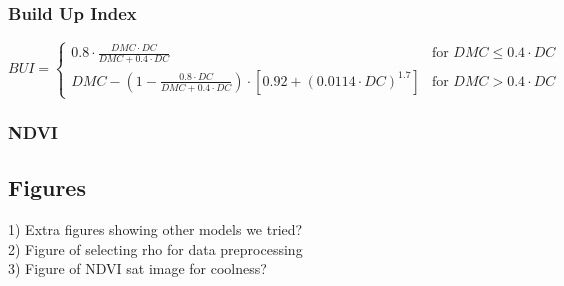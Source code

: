 \documentclass[twocolumn,10pt]{article}
\begin{document}
\subsubsection*{Build Up Index}
\begin{equation}
\label{eqn:bui}
    BUI = 
    \begin{cases}
        0.8 \cdot \frac{DMC \cdot DC}{DMC + 0.4 \cdot DC} & \text{for $DMC \leq 0.4 \cdot DC$}\\
        DMC - (1 - \frac{0.8 \cdot DC}{DMC + 0.4 \cdot DC}) \cdot [0.92 + (0.0114 \cdot DC)^{1.7}] & \text{for $DMC > 0.4 \cdot DC$}
    \end{cases}
\end{equation}
\subsubsection{NDVI}

\subsection{Figures}
1) Extra figures showing other models we tried? \\
2) Figure of selecting rho for data preprocessing \\
3) Figure of NDVI sat image for coolness? \\
\end{document}
